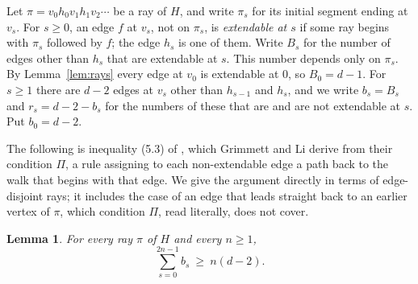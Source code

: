 \documentclass[11pt]{amsart}
\newtheorem{lemma}[theorem]{Lemma}
\theoremstyle{remark}
\begin{document}
Let $\pi=v_0h_0v_1h_1v_2\cdots$ be a ray of $H$, and write $\pi_s$ for its initial segment ending at $v_s$. For
$s\ge0$, an edge $f$ at $v_s$, not on $\pi_s$, is \emph{extendable at $s$} if some ray begins with $\pi_s$ followed
by $f$; the edge $h_s$ is one of them. Write $B_s$ for the number of edges other than $h_s$ that are extendable at
$s$. This number depends only on $\pi_s$. By Lemma~\ref{lem:rays} every edge at $v_0$ is extendable at $0$, so
$B_0=d-1$. For $s\ge1$ there are $d-2$ edges at $v_s$ other than $h_{s-1}$ and $h_s$, and we write $b_s=B_s$ and
$r_s=d-2-b_s$ for the numbers of these that are and are not extendable at $s$. Put $b_0=d-2$.

The following is inequality (5.3) of \cite{GL15}, which Grimmett and Li derive from their condition $\Pi$, a rule assigning to each
non-extendable edge a path back to the walk that begins with that edge. We give
the argument directly in terms of edge-disjoint rays; it includes the case of an edge that leads straight back to an
earlier vertex of $\pi$, which condition $\Pi$, read literally, does not cover.

\begin{lemma}\label{lem:branch}
For every ray $\pi$ of $H$ and every $n\ge1$,
\[
\sum_{s=0}^{2n-1}b_s\ \ge\ n(d-2).
\]
\end{lemma}
\end{document}
